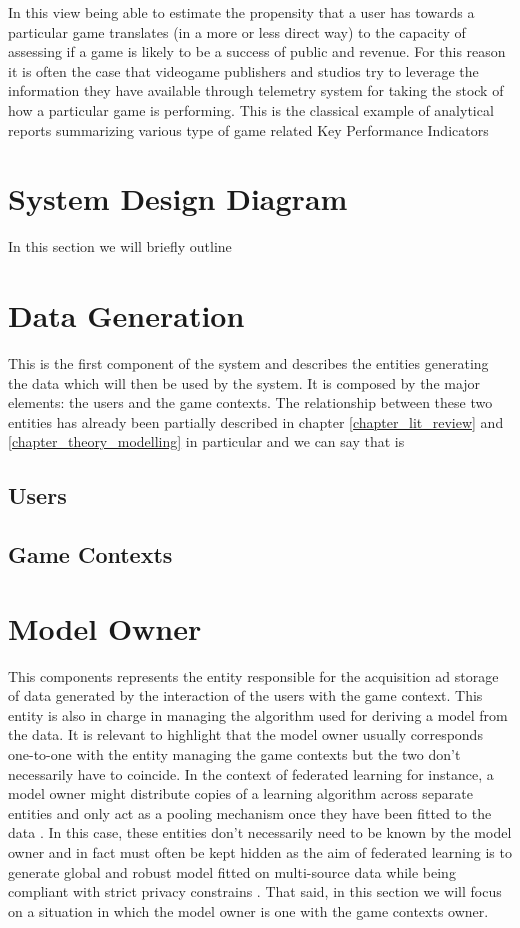 In this view being able to estimate the propensity that a user has towards a particular game translates (in a more or less direct way) to the capacity of assessing if a game is likely to be a success of public and revenue. For this reason it is often the case that videogame publishers and studios try to leverage the information they have available through telemetry system for taking the stock of how a particular game is performing. This is the classical example of analytical reports summarizing various type of game related Key Performance Indicators \cite{el2016game} 

\section{System Design Diagram}
\label{pipeline}
In this section we will briefly outline 

\section{Data Generation}
This is the first component of the system and describes the entities generating the data which will then be used by the system. It is composed by the major elements: the users and the game contexts. The relationship between these two entities has already been partially described in chapter \ref{chapter_lit_review} and \ref{chapter_theory_modelling} in particular and we can say that is 

\subsection{Users}
\lorem
\subsection{Game Contexts}
\lorem

\section{Model Owner}
This components represents the entity responsible for the acquisition ad storage of data generated by the interaction of the users with the game context. This entity is also in charge in managing the algorithm used for deriving a model from the data. It is relevant to highlight that the model owner usually corresponds one-to-one with the entity managing the game contexts but the two don't necessarily  have to coincide. In the context of federated learning  \cite{yang2019federated} for instance, a model owner might distribute copies of a learning algorithm across separate entities and only act as a pooling mechanism  once they have been fitted to the data \cite{kairouz2021advances}. In this case, these entities don't necessarily need to be known by the model owner and in fact must often be kept hidden as the aim of federated learning is to generate global and robust model fitted on multi-source data while being compliant with strict privacy constrains \cite{yang2019federated, kairouz2021advances}. That said, in this section we will focus on a situation in which the model owner is one with the game contexts owner.

